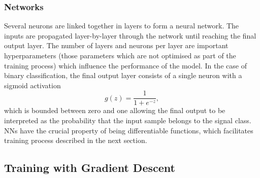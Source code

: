 \subsubsection{Networks}

Several neurons are linked together in layers to form a neural network.
The inputs are propagated layer-by-layer through the network until reaching the final output layer.
The number of layers and neurons per layer are important hyperparameters (those parameters which are not optimised as part of the training process) which influence the performance of the model.
In the case of binary classification, the final output layer consists of a single neuron with a sigmoid activation 
%
\begin{equation}\label{eq:sigmoid}
  g(z) = \frac{1}{1 + e^{-z}} ,
\end{equation}
%
which is bounded between zero and one allowing the final output to be interpreted as the probability that the input sample belongs to the signal class.
NNs have the crucial property of being differentiable functions, which facilitates training process described in the next section.





\subsection{Training with Gradient Descent}\label{sec:training_sgd}

